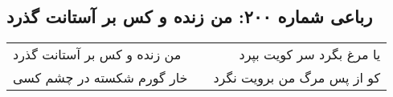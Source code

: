 \begin{center}
\section*{رباعی شماره ۲۰۰: من زنده و کس بر آستانت گذرد}
\label{sec:sh200}
\begin{longtable}{l p{0.5cm} r}
من زنده و کس بر آستانت گذرد
&&
یا مرغ بگرد سر کویت بپرد
\\
خار گورم شکسته در چشم کسی
&&
کو از پس مرگ من برویت نگرد
\\
\end{longtable}
\end{center}
